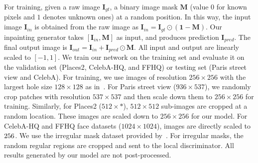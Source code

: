 \documentclass[journal]{IEEEtran}
\begin{document}
For training, given a raw image $\mathbf{I}_{gt}$, a binary image mask $\mathbf{M}$ (value $0$ for known pixels and $1$ denotes unknown ones) at a random position. In this way, the input image ${\mathbf{I}_{in}}$ is obtained from the raw image as ${\mathbf{I}_{in}} = {\mathbf{I}_{gt}} \odot \left( {\mathbf{1} - \mathbf{M}} \right)$. Our inpainting generator takes $\left[ {{\mathbf{I}_{in}},\mathbf{M}} \right]$ as input, and produces prediction ${\mathbf{I}_{pred}}$. The final output image is ${\mathbf{I}_{out}} = {\mathbf{I}_{in}} + {\mathbf{I}_{pred}} \odot \mathbf{M}$. All input and output are linearly scaled to $\left[ { - 1,1} \right]$. We train our network on the training set and evaluate it on the validation set (Places2, CelebA-HQ, and FFHQ) or testing set (Paris street view and CelebA). For training, we use images of resolution $256 \times 256$ with the largest hole size $128 \times 128$ as in~\cite{contextual-attention,GMCNN}. For Paris street view ($936 \times 537$), we randomly crop patches with resolution $537 \times 537$ and then scale down them to $256 \times 256$ for training. Similarly, for Places2 ($512 \times *$), $512 \times 512$ sub-images are cropped at a random location. These images are scaled down to $256 \times 256$ for our model. For CelebA-HQ and FFHQ face datasets ($1024 \times 1024$), images are directly scaled to $256 \time 256$. We use the irregular mask dataset provided by~\cite{partial-convolutions}. For irregular masks, the random regular regions are cropped and sent to the local discriminator. All results generated by our model are not post-processed.
\end{document}
